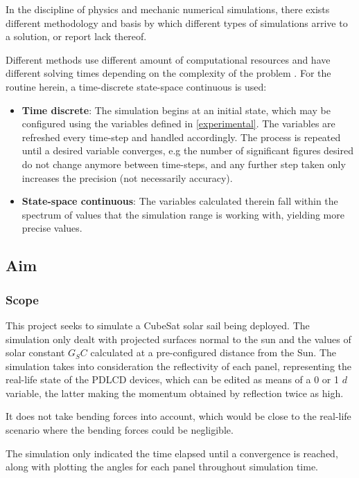 In the discipline of physics and mechanic numerical simulations, there exists different methodology and basis by which different types of simulations arrive to a solution, or report lack thereof.

Different methods use different amount of computational resources and have different solving times depending on the complexity of the problem \protect\cite{simulations}. For the routine herein, a time-discrete state-space continuous is used:

\begin{itemize}
    \item \textbf{Time discrete}: The simulation begins at an initial state, which may be configured using the variables defined in \ref{experimental}. The variables are refreshed every time-step and handled accordingly. The process is repeated until a desired variable converges, e.g the number of significant figures desired do not change anymore between time-steps, and any further step taken only increases the precision (not necessarily accuracy).
    \item \textbf{State-space continuous}: The variables calculated therein fall within the spectrum of values that the simulation range is working with, yielding more precise values.
\end{itemize}

\subsection{Aim}

\subsubsection{Scope}

This project seeks to simulate a CubeSat solar sail being deployed. The simulation only dealt with projected surfaces normal to the sun and the values of solar constant $G_SC$ calculated at a pre-configured distance from the Sun. The simulation takes into consideration the reflectivity of each panel, representing the real-life state of the PDLCD devices, which can be edited as means of a 0 or 1 $d$ variable, the latter making the momentum obtained by reflection twice as high.

It does not take bending forces into account, which would be close to the real-life scenario where the bending forces could be negligible.

The simulation only indicated the time elapsed until a convergence is reached, along with plotting the angles for each panel throughout simulation time.



